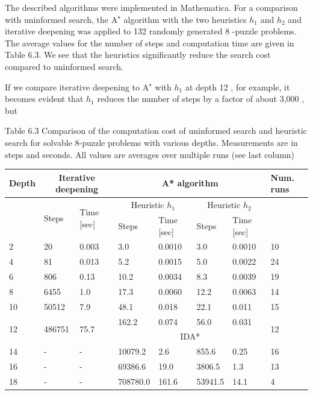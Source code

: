 \documentclass[10pt]{book}
\begin{document}
\begin{center}
The described algorithms were implemented in Mathematica. For a comparison with uninformed search, the $\mathrm{A}^{\star}$ algorithm with the two heuristics $h_{1}$ and $h_{2}$ and iterative deepening was applied to 132 randomly generated 8 -puzzle problems. The average values for the number of steps and computation time are given in Table 6.3. We see that the heuristics significantly reduce the search cost compared to uninformed search.

If we compare iterative deepening to $\mathrm{A}^{\star}$ with $h_{1}$ at depth 12 , for example, it becomes evident that $h_{1}$ reduces the number of steps by a factor of about 3,000 , but

Table 6.3 Comparison of the computation cost of uninformed search and heuristic search for solvable 8-puzzle problems with various depths. Measurements are in steps and seconds. All values are averages over multiple runs (see last column)

\begin{center}
\begin{tabular}{|l|l|l|l|l|l|l|l|}
\hline
\multirow[t]{3}{*}{Depth} & \multicolumn{2}{|c|}{Iterative deepening} & \multicolumn{4}{|c|}{A* algorithm} & \multirow[t]{3}{*}{Num. runs} \\
\hline
 & \multirow[t]{2}{*}{Steps} & \multirow{2}{*}{Time [sec]} & \multicolumn{2}{|c|}{Heuristic $h_{1}$} & \multicolumn{2}{|c|}{Heuristic $h_{2}$} &  \\
\hline
 &  &  & Steps & Time [sec] & Steps & Time [sec] &  \\
\hline
2 & 20 & 0.003 & 3.0 & 0.0010 & 3.0 & 0.0010 & 10 \\
\hline
4 & 81 & 0.013 & 5.2 & 0.0015 & 5.0 & 0.0022 & 24 \\
\hline
6 & 806 & 0.13 & 10.2 & 0.0034 & 8.3 & 0.0039 & 19 \\
\hline
8 & 6455 & 1.0 & 17.3 & 0.0060 & 12.2 & 0.0063 & 14 \\
\hline
10 & 50512 & 7.9 & 48.1 & 0.018 & 22.1 & 0.011 & 15 \\
\hline
\multirow[t]{2}{*}{12} & \multirow[t]{2}{*}{486751} & \multirow[t]{2}{*}{75.7} & 162.2 & 0.074 & 56.0 & 0.031 & \multirow[t]{2}{*}{12} \\
\hline
 &  &  & \multicolumn{4}{|c|}{IDA*} &  \\
\hline
14 & - & - & 10079.2 & 2.6 & 855.6 & 0.25 & 16 \\
\hline
16 & - & - & 69386.6 & 19.0 & 3806.5 & 1.3 & 13 \\
\hline
18 & - & - & 708780.0 & 161.6 & 53941.5 & 14.1 & 4 \\
\hline
\end{tabular}
\end{center}


\end{center}
\end{document}
